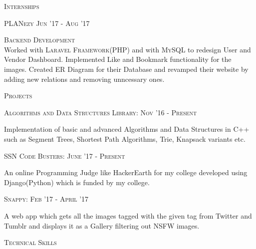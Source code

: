 \documentclass[10pt]{article}
\begin{document}
	{\centering\Large{\textsc{Internships}}	\hrulefill}
	
	\vspace{3mm}
	
	\large\textsc{PLANezy}
	\hfill{\small{\textsc{Jun '17 - Aug '17}}}
	
	\begin{changemargin}{1.0cm}{0.0cm} 
	{
	\large{\textsc{{Backend Development}}}  \\
	\small{Worked with \textsc{Laravel Framework}(PHP) and with \textsc{MySQL} to redesign User and Vendor Dashboard. Implemented Like and Bookmark functionality for the images. Created ER Diagram for their Database and revamped their website by adding new relations and removing unncessary ones.} 		
	}
	\end{changemargin} 	 	
	\vspace{3mm}

	{\centering\Large{\textsc{Projects}} \hrulefill}
		
	\vspace{3mm}
	
	\large{\textsc{Algorithms and Data Structures Library:}}   \hfill \small\textsc{Nov '16 - Present}
	\begin{itemize}
	\small
	{
	\item Implementation of basic and advanced Algorithms and Data Structures in C++ such as Segment Trees, Shortest Path Algorithms, Trie, Knapsack variants etc.
	}
	\end{itemize}	
	\vspace{2mm}
	\large{\textsc{SSN Code Busters:}}   \hfill \small\textsc{June '17 - Present}
	\begin{itemize}
	\small
	{
	\item An online Programming Judge like HackerEarth for my college developed using Django(Python) which is funded by my college.
	}
	\end{itemize}	
	\vspace{2mm}
	\large{\textsc{Snappy:}}   \hfill \small\textsc{Feb '17 - April '17}
	\begin{itemize}
	\small
	{
	\item A web app which gets all the images tagged with the given tag from Twitter and Tumblr and displays it as a Gallery filtering out NSFW images.
	}
	\end{itemize}	
	\vspace{3mm}
	
		{\centering\Large{\textsc{Technical Skills}}\hrulefill}
	
\end{document}
